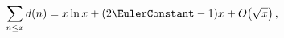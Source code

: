 \[\sum_{n\leq x}\mathop{d\/}\nolimits\!\left(n\right)=x\mathop{\ln\/}\nolimits x%
+(2\EulerConstant-1)x+\mathop{O\/}\nolimits\!\left(\sqrt{x}\right),\]